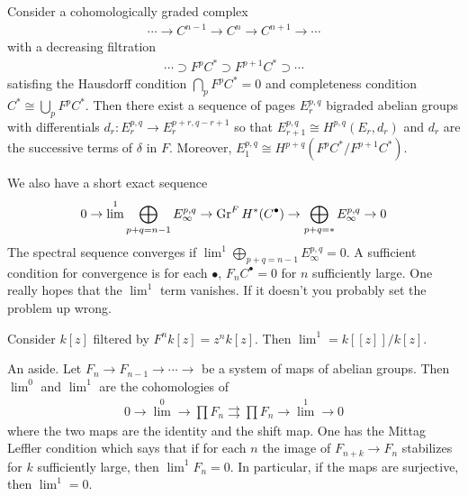 \documentclass[12pt]{article}
\begin{document}
\begin{theorem}
     Consider a cohomologically graded complex \begin{align*}
    \cdots \to C^{n-1} \to C^n \to C^{n+1} \to \cdots
    \end{align*} with a decreasing filtration
\begin{align*}
    \cdots \supset F^p C^* \supset F^{p+1} C^* \supset \cdots
\end{align*} satisfing the Hausdorff condition $\bigcap_p F^p C^* = 0$ and completeness condition $C^* \cong \bigcup_p F^p C^*$. Then there exist a sequence of pages $E_r^{p,q}$ bigraded abelian groups with differentials $d_r: E_r^{p,q} \to E_r^{p+r,q-r+1}$ so that $E_{r+1}^{p,q} \cong H^{p,q}(E_r,d_r)$ and $d_r$ are the successive terms of $\delta$ in $F$. Moreover, $E_1^{p,q} \cong H^{p+q}(F^p C^*/F^{p+1} C^*)$. 

We also have a short exact sequence \begin{align*}
    0\to \lim^1 \bigoplus_{p+q=n-1} E^{p,q}_\infty 
    \to \operatorname{Gr}^F H^*(C^\bullet) \to \bigoplus_{p+q = *} E_\infty^{p,q} \to 0
\end{align*}
The spectral sequence converges if $\lim^1 \bigoplus_{p+q=n-1} E^{p,q}_\infty = 0$. A sufficient condition for convergence is for each $\bullet$, $F_n C^\bullet = 0$ for $n$ sufficiently large. One really hopes that the $\lim^1$ term vanishes. If it doesn't you probably set the problem up wrong.
\end{theorem}

\begin{example}
    Consider $k[z]$ filtered by $F^n k[z] = z^n k[z]$. Then $\lim^1 = k[[z]]/k[z]$.
\end{example}
An aside. Let $F_n\to F_{n-1} \to \cdots \to$ be a system of maps of abelian groups. Then $\lim^0$ and $\lim^1$ are the cohomologies of \begin{align*}
    0 \to \lim^0 \to \prod F_n \rightrightarrows \prod F_n \to \lim^1 \to 0
\end{align*} where the two maps are the identity and the shift map. One has the Mittag Leffler condition which says that if for each $n$ the image of $F_{n+k} \to F_n$ stabilizes for $k$ sufficiently large, then $\lim^1 F_n = 0$. In particular, if the maps are surjective, then $\lim^1 = 0$.
\end{document}
